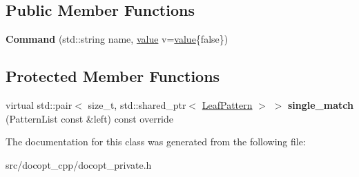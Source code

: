 \subsection*{Public Member Functions}
\begin{DoxyCompactItemize}
\item 
\mbox{\label{classdocopt_1_1Command_a94e1480a83f75acf6c1e7d506253c319}} 
{\bfseries Command} (std\+::string name, \hyperlink{structdocopt_1_1value}{value} v=\hyperlink{structdocopt_1_1value}{value}\{false\})
\end{DoxyCompactItemize}
\subsection*{Protected Member Functions}
\begin{DoxyCompactItemize}
\item 
\mbox{\label{classdocopt_1_1Command_a914bd0c3225c4e14ed55bacb873ca87f}} 
virtual std\+::pair$<$ size\+\_\+t, std\+::shared\+\_\+ptr$<$ \hyperlink{classdocopt_1_1LeafPattern}{Leaf\+Pattern} $>$ $>$ {\bfseries single\+\_\+match} (Pattern\+List const \&left) const override
\end{DoxyCompactItemize}


The documentation for this class was generated from the following file\+:\begin{DoxyCompactItemize}
\item 
src/docopt\+\_\+cpp/docopt\+\_\+private.\+h\end{DoxyCompactItemize}
